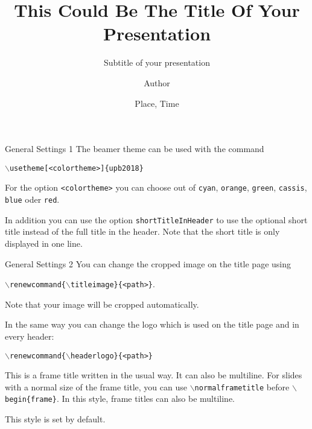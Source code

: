 \documentclass[
	] {beamer}
\title[SHORTTITLE]{This Could Be The Title Of Your Presentation}
\subtitle{Subtitle of your presentation}
\institute{PADERBORN UNIVERSITY} %
\author{Author}
\date{Place, Time}
\begin{document}
\begin{frame}[plain]
	\titlepage
\end{frame}



\begin{frame}{General Settings 1}
	The beamer theme  can be used with the command 
	\begin{center}
		\texttt{$\backslash$usetheme[<colortheme>]\{upb2018\}}
	\end{center}

	For the option \texttt{<colortheme>} you can choose out of
	\texttt{cyan}, \texttt{orange}, \texttt{green}, \texttt{cassis}, \texttt{blue} oder
	\texttt{red}.

	In addition you can use the option \texttt{shortTitleInHeader} to
	use the optional short title instead of the full title in the header. Note that
	the short title is only displayed in one line.
\end{frame}



\begin{frame}{General Settings 2}
	You can change the cropped image on the title page using

	\begin{center}
		\texttt{$\backslash$renewcommand\{$\backslash$titleimage\}\{<path>\}}.
	\end{center}

	Note that your image will be cropped automatically.

	\vfill

	In the same way you can change the logo which is used on the title page and
	in every header:
	\begin{center}
		\texttt{$\backslash$renewcommand\{$\backslash$headerlogo\}\{<path>\}}
	\end{center}
\end{frame}



\normalframetitle %
\begin{frame}{This is a frame title written in the usual way. It can also
be multiline.}
	For slides with a normal size of the frame title, you can use \texttt{$\backslash$normalframetitle}
	before \texttt{$\backslash$begin\{frame\}}. In this style, frame titles can
	also be multiline.

	This style is set by default.
\end{frame}
\end{document}
